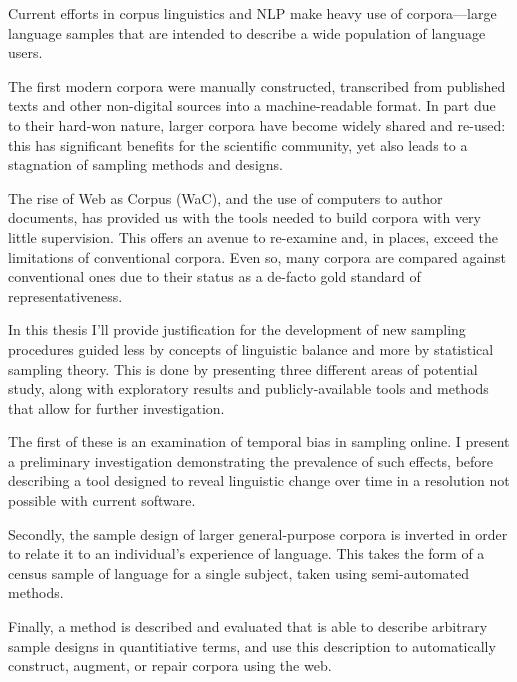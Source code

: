 Current efforts in corpus linguistics and NLP make heavy use of corpora---large language samples that are intended to describe a wide population of language users.


The first modern corpora were manually constructed, transcribed from published texts and other non-digital sources into a machine-readable format.  In part due to their hard-won nature, larger corpora have become widely shared and re-used: this has significant benefits for the scientific community, yet also leads to a stagnation of sampling methods and designs.

The rise of Web as Corpus (WaC), and the use of computers to author documents, has provided us with the tools needed to build corpora with very little supervision.  
This offers an avenue to re-examine and, in places, exceed the limitations of conventional corpora.  
Even so, many corpora are compared against conventional ones due to their status as a de-facto gold standard of representativeness.


In this thesis I'll provide justification for the development of new sampling procedures guided less by concepts of linguistic balance and more by statistical sampling theory.
This is done by presenting three different areas of potential study, along with exploratory results and publicly-available tools and methods that allow for further investigation.

The first of these is an examination of temporal bias in sampling online.  I present a preliminary investigation demonstrating the prevalence of such effects, before describing a tool designed to reveal linguistic change over time in a resolution not possible with current software.

Secondly, the sample design of larger general-purpose corpora is inverted in order to relate it to an individual's experience of language.  This takes the form of a census sample of language for a single subject, taken using semi-automated methods.

Finally, a method is described and evaluated that is able to describe arbitrary sample designs in quantitiative terms, and use this description to automatically construct, augment, or repair corpora using the web.




